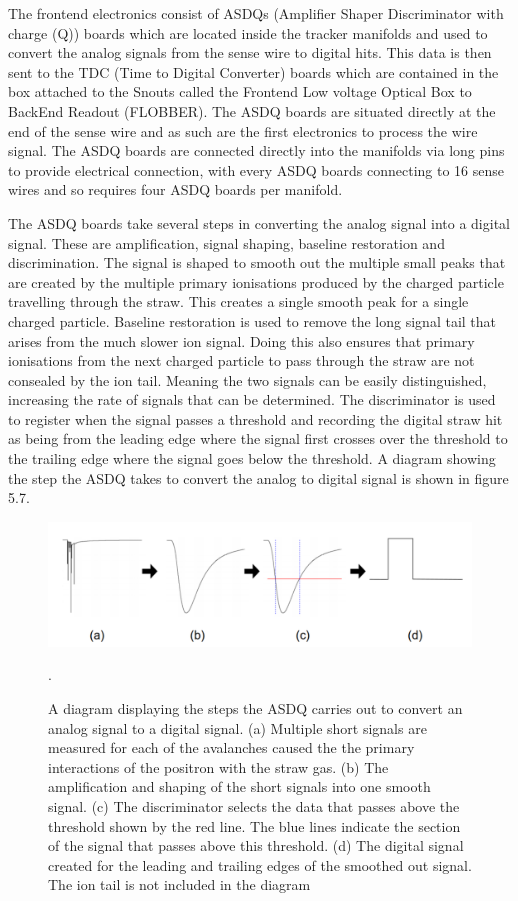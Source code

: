 The frontend electronics consist of ASDQs (Amplifier Shaper Discriminator with charge (Q)) boards which are located inside the tracker manifolds and used to convert the analog signals from the sense wire to digital hits. This data is then sent to the TDC (Time to Digital Converter) boards which are contained in the box attached to the Snouts called the Frontend Low voltage Optical Box to BackEnd Readout (FLOBBER). The ASDQ boards are situated directly at the end of the sense wire and as such are the first electronics to process the wire signal. The ASDQ boards are connected directly into the manifolds via long pins to provide electrical connection, with every ASDQ boards connecting to 16 sense wires and so requires four ASDQ boards per manifold.

The ASDQ boards take several steps in converting the analog signal into a digital signal. These are amplification, signal shaping, baseline restoration and discrimination. The signal is shaped to smooth out the multiple small peaks that are created by the multiple primary ionisations produced by the charged particle travelling through the straw. This creates a single smooth peak for a single charged particle. Baseline restoration is used to remove the long signal tail that arises from the much slower ion signal. Doing this also ensures that primary ionisations from the next charged particle to pass through the straw are not consealed by the ion tail. Meaning the two signals can be easily distinguished, increasing the rate of signals that can be determined. The discriminator is used to register when the signal passes a threshold and recording the digital straw hit as being from the leading edge where the signal first crosses over the threshold to the trailing edge where the signal goes below the threshold. A diagram showing the step the ASDQ takes to convert the analog to digital signal is shown in figure 5.7.

\begin{figure}[th]
\centering
\includegraphics[scale=0.5]{Figures/asdqsignalpath.png}
\decoRule
\caption{A diagram displaying the steps the ASDQ carries out to convert an analog signal to a digital signal. (a) Multiple short signals are measured for each of the avalanches caused the the primary interactions of the positron with the straw gas. (b) The amplification and shaping of the short signals into one smooth signal. (c) The discriminator selects the data that passes above the threshold shown by the red line. The blue lines indicate the section of the signal that passes above this threshold. (d) The digital signal created for the leading and trailing edges of the smoothed out signal. The ion tail is not included in the diagram \cite{analogtodigital}}.
\label{fig:asdqsignalpath}
\end{figure}

